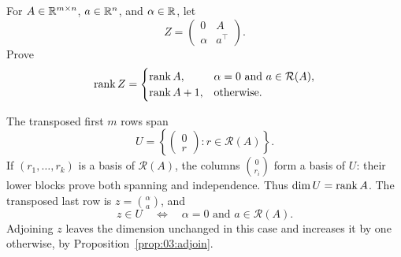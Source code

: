 \begin{problem}\label{ex:03:border}
For \(A\in\mathbb R^{m\times n}\), \(a\in\mathbb R^n\), and \(\alpha\in\mathbb R\), let
\[
Z=\begin{pmatrix}0&A\\\alpha&a^\top\end{pmatrix}.
\]
Prove
\[
\operatorname{rank} Z=\begin{cases}
\operatorname{rank} A,&\alpha=0\text{ and }a\in\mathcal R(A),\\
\operatorname{rank} A+1,&\text{otherwise}.
\end{cases}
\]
\end{problem}
\begin{solution}
The transposed first \(m\) rows span
\[
U=\left\{\begin{pmatrix}0\\r\end{pmatrix}:r\in\mathcal R(A)\right\}.
\]
If \((r_1,\ldots,r_k)\) is a basis of \(\mathcal R(A)\), the columns
\(\binom{0}{r_i}\) form a basis of \(U\): their lower blocks prove
both spanning and independence. Thus \(\dim U=\operatorname{rank} A\).
The transposed last row is \(z=\binom{\alpha}{a}\), and
\[
z\in U\quad\Longleftrightarrow\quad \alpha=0\text{ and }a\in\mathcal R(A).
\]
Adjoining \(z\) leaves the dimension unchanged in this case and increases
it by one otherwise, by Proposition~\ref{prop:03:adjoin}.
\end{solution}

